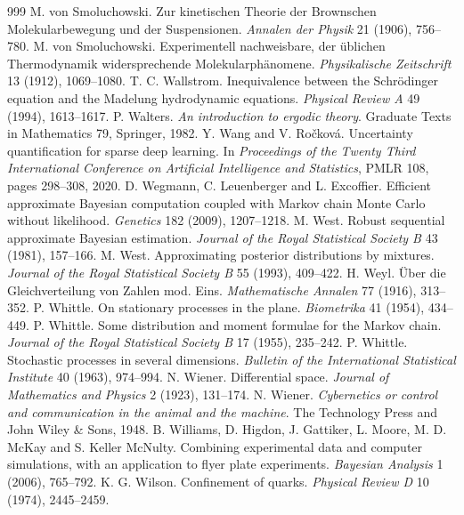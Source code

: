 \begin{thebibliography}{999}
 M. von Smoluchowski. Zur kinetischen Theorie der Brownschen Molekularbewegung und der Suspensionen. \emph{Annalen der Physik} 21 (1906), 756--780.
 M. von Smoluchowski. Experimentell nachweisbare, der \"ublichen Thermodynamik widersprechende Molekularph\"anomene. \emph{Physikalische Zeitschrift} 13 (1912), 1069--1080.
 T. C. Wallstrom. Inequivalence between the Schr\"odinger equation and the Madelung hydrodynamic equations. \emph{Physical Review A} 49 (1994), 1613--1617.
 P. Walters. \emph{An introduction to ergodic theory}. Graduate Texts in Mathematics 79, Springer, 1982.
 Y. Wang and V. Ro\v{c}kov\'a. Uncertainty quantification for sparse deep learning. In \emph{Proceedings of the Twenty Third International Conference on Artificial Intelligence and Statistics}, PMLR 108, pages 298--308, 2020.
 D. Wegmann, C. Leuenberger and L. Excoffier. Efficient approximate Bayesian computation coupled with Markov chain Monte Carlo without likelihood. \emph{Genetics} 182 (2009), 1207--1218.
 M. West. Robust sequential approximate Bayesian estimation. \emph{Journal of the Royal Statistical Society B} 43 (1981), 157--166.
 M. West. Approximating posterior distributions by mixtures. \emph{Journal of the Royal Statistical Society B} 55 (1993), 409--422.
 H. Weyl. \"Uber die Gleichverteilung von Zahlen mod. Eins. \emph{Mathematische Annalen} 77 (1916), 313--352.
 P. Whittle. On stationary processes in the plane. \emph{Biometrika} 41 (1954), 434--449.
 P. Whittle. Some distribution and moment formulae for the Markov chain. \emph{Journal of the Royal Statistical Society B} 17 (1955), 235--242.
 P. Whittle. Stochastic processes in several dimensions. \emph{Bulletin of the International Statistical Institute} 40 (1963), 974--994.
 N. Wiener. Differential space. \emph{Journal of Mathematics and Physics} 2 (1923), 131--174.
 N. Wiener. \emph{Cybernetics or control and communication in the animal and the machine}. The Technology Press and John Wiley \& Sons, 1948.
 B. Williams, D. Higdon, J. Gattiker, L. Moore, M. D. McKay and S. Keller McNulty. Combining experimental data and computer simulations, with an application to flyer plate experiments. \emph{Bayesian Analysis} 1 (2006), 765--792.
 K. G. Wilson. Confinement of quarks. \emph{Physical Review D} 10 (1974), 2445--2459.

\end{thebibliography}
